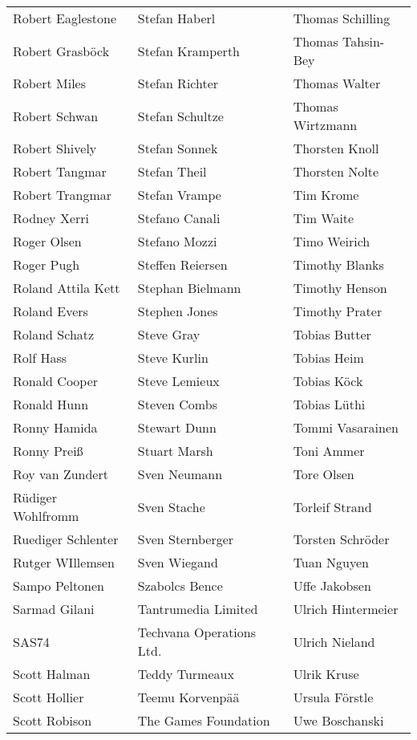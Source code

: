\begin{tabular}{p{4.5cm}p{4.5cm}p{4.5cm}}
Robert Eaglestone & Stefan Haberl & Thomas Schilling \\
Robert Grasböck & Stefan Kramperth & Thomas Tahsin-Bey \\
Robert Miles & Stefan Richter & Thomas Walter \\
Robert Schwan & Stefan Schultze & Thomas Wirtzmann \\
Robert Shively & Stefan Sonnek & Thorsten Knoll \\
Robert Tangmar & Stefan Theil & Thorsten Nolte \\
Robert Trangmar & Stefan Vrampe & Tim Krome \\
Rodney Xerri & Stefano Canali & Tim Waite \\
Roger Olsen & Stefano Mozzi & Timo Weirich \\
Roger Pugh & Steffen Reiersen & Timothy Blanks \\
Roland Attila Kett & Stephan Bielmann & Timothy Henson \\
Roland Evers & Stephen Jones & Timothy Prater \\
Roland Schatz & Steve Gray & Tobias Butter \\
Rolf Hass & Steve Kurlin & Tobias Heim \\
Ronald Cooper & Steve Lemieux & Tobias Köck \\
Ronald Hunn & Steven Combs & Tobias Lüthi \\
Ronny Hamida & Stewart Dunn & Tommi Vasarainen \\
Ronny Preiß & Stuart Marsh & Toni Ammer \\
Roy van Zundert & Sven Neumann & Tore Olsen \\
Rüdiger Wohlfromm & Sven Stache & Torleif Strand \\
Ruediger Schlenter & Sven Sternberger & Torsten Schröder \\
Rutger WIllemsen & Sven Wiegand & Tuan Nguyen \\
Sampo Peltonen & Szabolcs Bence & Uffe Jakobsen \\
Sarmad Gilani & Tantrumedia Limited & Ulrich Hintermeier \\
SAS74 & Techvana Operations Ltd. & Ulrich Nieland \\
Scott Halman & Teddy Turmeaux & Ulrik Kruse \\
Scott Hollier & Teemu Korvenpää & Ursula Förstle \\
Scott Robison & The Games Foundation & Uwe Boschanski \\

\end{tabular}
